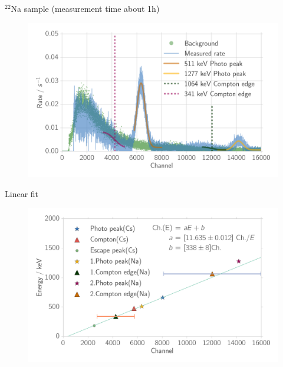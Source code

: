 \documentclass[xcolor=x11names,compress]{beamer}
\renewcommand{\(}{\begin{columns}}
\renewcommand{\)}{\end{columns}}
\newcommand{\<}[1]{\begin{column}{#1}}
\renewcommand{\>}{\end{column}}
\begin{document}
\begin{frame}[t]{$^{22}$Na sample (measurement time about 1h) }
    
\begin{figure}[htpb]
    \centering
    \includegraphics[width=1.0\linewidth]{../analysis/figures/histo_na_22na}
\label{fig:histo_na_22na}
\end{figure}

\end{frame}

\begin{frame}[t]{Linear fit}
 \begin{figure}[htpb]
    \centering
    \includegraphics[width=1.0\linewidth]{../analysis/figures/calibration_na_linear_fit}
    \label{fig:calibration_na_linear_fit}
\end{figure}
   
\end{frame}
\end{document}
